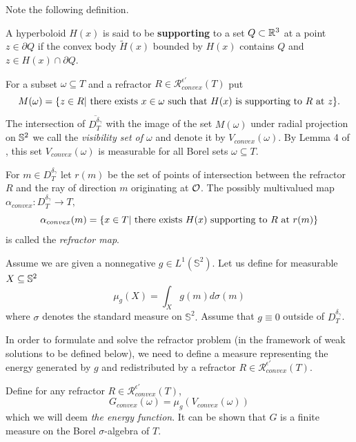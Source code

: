 \documentclass[review]{elsarticle}
\begin{document}
Note the following definition.
\begin{Def}\label{supportdef}
A hyperboloid $H(x)$ is said to be \textbf{supporting} to a set $Q\subset \mathbb{R}^3$ at a point $z\in \partial Q$ if the convex body $\tilde{H}(x)$ bounded by $H(x)$ contains $Q$ and $z\in H(x)\cap \partial Q$.
\end{Def}  
For a subset $\omega \subseteq T$ and a refractor $R\in \mathcal{R}_{convex}^{\epsilon'}(T)$ put 
\begin{equation}
M(\omega)=\{z\in R| \textnormal{ there exists } x\in \omega \textnormal{ such that } H(x) \textnormal{ is supporting to } R \textnormal{ at }z\}.
\end{equation}
The intersection of $\overline{D_T^{\delta_\gamma}}$ with the image of the set $M(\omega)$ under radial projection on $\mathbb{S}^2$ we call the {\it visibility set of $\omega$} and denote it by $V_{convex} (\omega).$ By Lemma 4 of \cite{KOT}, this set $V_{convex} (\omega)$ is measurable for all Borel sets $\omega \subseteq T.$

For $m \in D_T^{\delta_\gamma}$ let $r(m)$ be the set of points of intersection between the refractor $R$ and the ray of direction $m$ originating at $\mathcal{O}$. The possibly multivalued map $\alpha_{convex}:D_T^{\delta_\gamma} \to T,$
\begin{equation}
     \alpha_{convex}(m)=\{x\in T| \textnormal{ there exists } H(x) \textnormal{ supporting to } R\textnormal{ at } r(m)\}
\end{equation}
is called the {\it refractor map}.

Assume we are given a nonnegative $g\in L^1(\mathbb{S}^2)$. Let us define for measurable $X\subseteq \mathbb{S}^2$
\begin{equation}\label{s-meas-convex}
    \mu_{g}(X)=\int_X g(m) d\sigma(m)
\end{equation}
where $\sigma$ denotes the standard measure on $\mathbb{S}^2.$ Assume that $g\equiv 0$ outside of $D_T^{\delta_\gamma}$. 

In order to formulate and solve the refractor problem (in the framework of weak solutions to be defined below), we need to define a measure representing the energy generated by $g$ and redistributed by a refractor $R \in  \mathcal{R}_{convex}^{\epsilon'}(T ).$


Define for any refractor $R\in \mathcal{R}_{convex}^{\epsilon'}(T)$, 
\begin{equation}
    G_{convex}(\omega)=\mu_{g}(V_{convex}(\omega))
\end{equation}
which we will deem {\it the energy function}. It can be shown that $G$ is a finite measure on the Borel $\sigma$-algebra of $T$.
\end{document}
